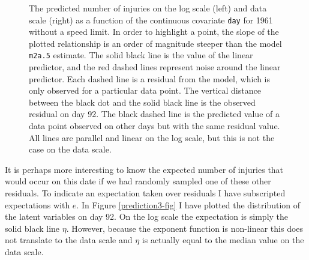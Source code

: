 \documentclass{article}
\begin{document}
\begin{figure}
\begin{minipage}[b]{0.5\linewidth}
\end{minipage}
\label{prediction1-fig}
\caption{The predicted number of injuries on the log scale (left) and data scale (right) as a function of the continuous covariate \texttt{day} for 1961 without a speed limit. In order to highlight a point, the slope of the plotted relationship is an order of magnitude steeper than the model \texttt{m2a.5} estimate.  The solid black line is the value of the linear predictor, and the red dashed lines represent noise around the linear predictor. Each dashed line is a residual from the model, which is only observed for a particular data point. The vertical distance between the black dot and the solid black line is the observed residual on day 92. The black dashed line is the predicted value of a data point observed on other days but with the same residual value.  All lines are parallel and linear on the log scale, but this is not the case on the data scale.
}
\end{figure}


It is perhaps more interesting to know the expected number of injuries that would occur on this date if we had randomly sampled one of these other residuals. To indicate an expectation taken over residuals I have subscripted expectations with $e$.  In Figure \ref{prediction3-fig}  I have plotted the distribution of the latent variables on day 92. On the log scale the expectation is simply the solid black line $\eta$. However, because the exponent function is non-linear this does not translate to the data scale and $\eta$ is actually equal to the median value on the data scale.\\ 


\iftalk
\else
\fi

\iftalk
\else
\fi
\end{document}

